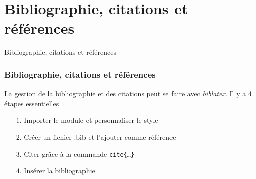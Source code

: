 
\section{Bibliographie, citations et références}

\begin{frame}
    \vfill
    \begin{center}
        \large
        Bibliographie, citations et références
    \end{center}
    \vfill
\end{frame}

\begin{frame}
    \frametitle{Bibliographie, citations et références}
    La gestion de la bibliographie et des citations peut se faire avec \textcolor{vibrant_green}{\textit{biblatex}}\footnotemark. Il y a 4 étapes essentielles
    \vspace{0.3cm}
    \begin{itemize}
    \pause
        \item[$1.$] Importer le module et personnaliser le style
            \pause
        \item[$2.$] Créer un fichier .bib et l'ajouter comme référence
            \pause
        \item[$3.$] Citer grâce à la commande \texttt{cite\{\dots\}}
            \pause
        \item[$4.$] Insérer la bibliographie
    \end{itemize}
\end{frame}

